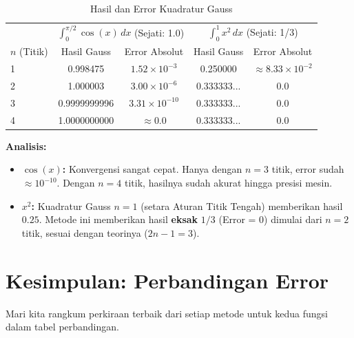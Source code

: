 \documentclass[a4paper, 11pt]{article} %
\begin{document}
\begin{table}[H] %
\centering %
\caption{Hasil dan Error Kuadratur Gauss} %
\begin{tabular}{l c c c c} %
\toprule %
 & \multicolumn{2}{c}{$\int_0^{\pi/2} \cos(x) \, dx$ (Sejati: 1.0)} & \multicolumn{2}{c}{$\int_0^1 x^2 \, dx$ (Sejati: 1/3)} \\ %
$n$ (Titik) & Hasil Gauss & Error Absolut & Hasil Gauss & Error Absolut \\ %
\midrule %
1 & 0.998475 & $1.52 \times 10^{-3}$ & 0.250000 & $\approx 8.33 \times 10^{-2}$ \\ %
2 & 1.000003 & $3.00 \times 10^{-6}$ & 0.333333... & 0.0 \\ %
3 & 0.9999999996 & $3.31 \times 10^{-10}$ & 0.333333... & 0.0 \\ %
4 & 1.0000000000 %
& $\approx 0.0$ & 0.333333... & 0.0 \\ %
\bottomrule %
\end{tabular} %
\end{table} %
\textbf{Analisis:} %
\begin{itemize}
    \item \textbf{$\cos(x)$:} Konvergensi sangat cepat. Hanya dengan $n=3$ titik, error sudah $\approx 10^{-10}$. %
    Dengan $n=4$ titik, hasilnya sudah akurat hingga presisi mesin. %
    \item \textbf{$x^2$:} Kuadratur Gauss $n=1$ (setara Aturan Titik Tengah) memberikan hasil $0.25$. Metode ini memberikan hasil \textbf{eksak} $1/3$ (Error = 0) dimulai dari $n=2$ titik, sesuai dengan teorinya ($2n-1 = 3$). %
\end{itemize}

\newpage %
\section{Kesimpulan: Perbandingan Error} %

Mari kita rangkum perkiraan terbaik dari setiap metode untuk kedua fungsi dalam tabel perbandingan. %
\end{document}
